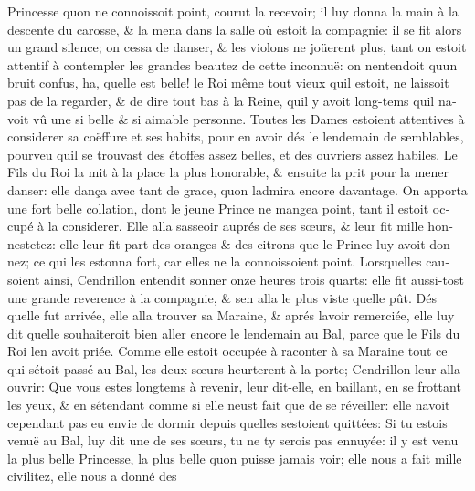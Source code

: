\documentclass[14pt,a4paper]{memoir}
\begin{document}
{{\begin{otherlanguage}{french}
Princesse qu\textquotesingle on ne connoissoit point, courut la
recevoir; il luy donna la main à la descente du carosse, \& la mena dans
la salle où estoit la compagnie: il se fit alors un grand silence; on
cessa de danser, \& les violons ne joüerent plus, tant on estoit
attentif à contempler les grandes beautez de cette inconnuë: on
n\textquotesingle entendoit qu\textquotesingle un bruit confus, ha,
qu\textquotesingle elle est belle! le Roi même tout vieux
qu\textquotesingle il estoit, ne laissoit pas de la regarder, \& de dire
tout bas à la Reine, qu\textquotesingle il y avoit long-tems
qu\textquotesingle il n\textquotesingle avoit vû une si belle \& si
aimable personne. Toutes les Dames estoient attentives à considerer sa
coëffure et ses habits, pour en avoir dés le lendemain de semblables,
pourveu qu\textquotesingle il se trouvast des étoffes assez belles, et
des ouvriers assez habiles. Le Fils du Roi la mit à la place la plus
honorable, \& ensuite la prit pour la mener danser: elle dança avec tant
de grace, qu\textquotesingle on l\textquotesingle admira encore
davantage. On apporta une fort belle collation, dont le jeune Prince ne
mangea point, tant il estoit occupé à la considerer. Elle alla
s\textquotesingle asseoir auprés de ses sœurs, \& leur fit mille
honnestetez: elle leur fit part des oranges \& des citrons que le Prince
luy avoit donnez; ce qui les estonna fort, car elles ne la connoissoient
point. Lorsqu\textquotesingle elles causoient ainsi, Cendrillon entendit
sonner onze heures trois quarts: elle fit aussi-tost une grande
reverence à la compagnie, \& s\textquotesingle en alla le plus viste
qu\textquotesingle elle pût. Dés qu\textquotesingle elle fut arrivée,
elle alla trouver sa Maraine, \& aprés l\textquotesingle avoir
remerciée, elle luy dit qu\textquotesingle elle souhaiteroit bien aller
encore le lendemain au Bal, parce que le Fils du Roi
l\textquotesingle en avoit priée. Comme elle estoit occupée à raconter à
sa Maraine tout ce qui s\textquotesingle étoit passé au Bal, les deux
sœurs heurterent à la porte; Cendrillon leur alla ouvrir: Que vous estes
longtems à revenir, leur dit-elle, en baillant, en se frottant les yeux,
\& en s\textquotesingle étendant comme si elle n\textquotesingle eust
fait que de se réveiller: elle n\textquotesingle avoit cependant pas eu
envie de dormir depuis qu\textquotesingle elles
s\textquotesingle estoient quittées: Si tu estois venuë au Bal, luy dit
une de ses sœurs, tu ne t\textquotesingle y serois pas ennuyée: il y est
venu la plus belle Princesse, la plus belle qu\textquotesingle on puisse
jamais voir; elle nous a fait mille civilitez, elle nous a donné des

\end{otherlanguage}}}
\end{document}
